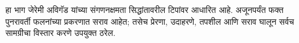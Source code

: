 \documentclass[../../include/open-logic-part]{subfiles}
\begin{document}

\begin{editorial}
  हा भाग जेरेमी अविगॅड यांच्या संगणनक्षमता सिद्धांतावरील टिपांवर आधारित
  आहे. अजूनपर्यंत फक्त पुनरावर्ती फलनांच्या प्रकरणात सराव आहेत; तसेच
  प्रेरणा, उदाहरणे, तपशील आणि सराव घालून सर्वच सामग्रीचा विस्तार करणे
  उपयुक्त ठरेल.
\end{editorial}



\OLEndPartHook
\end{document}
